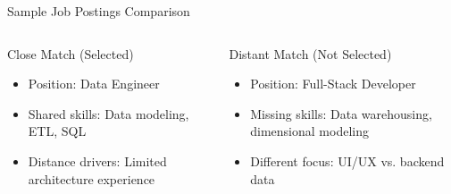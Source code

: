 \documentclass{beamer}
\begin{document}
\begin{frame}{Sample Job Postings Comparison}
\begin{columns}
\begin{column}{0.48\textwidth}
\begin{block}{Close Match (Selected)}
\begin{itemize}
    \item Position: Data Engineer
    \item Shared skills: Data modeling, ETL, SQL
    \item Distance drivers: Limited architecture experience
\end{itemize}
\end{block}
\end{column}
\begin{column}{0.48\textwidth}
\begin{block}{Distant Match (Not Selected)}
\begin{itemize}
    \item Position: Full-Stack Developer
    \item Missing skills: Data warehousing, dimensional modeling
    \item Different focus: UI/UX vs. backend data
\end{itemize}
\end{block}
\end{column}
\end{columns}

\vspace{0.5cm}
\begin{center}
\end{center}
\end{frame}
\end{document}

